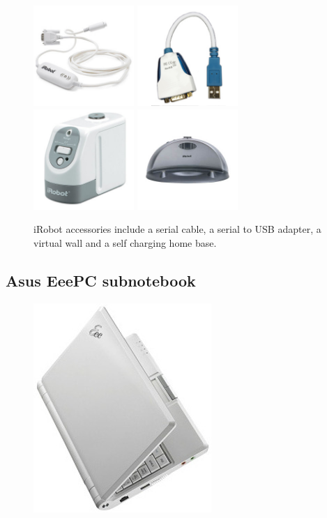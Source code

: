 \begin{figure}
\centerline{
\mbox{\includegraphics[width=1.50in]{figures/2_serial_cable.jpg}}
\mbox{\includegraphics[width=1.50in]{figures/2_serialusb_cord.jpg}}
\mbox{\includegraphics[width=1.50in]{figures/2_irwall.jpg}}
\mbox{\includegraphics[width=1.50in]{figures/2_homebase.jpg}}
}
\caption{iRobot accessories include a serial cable, a serial to USB adapter, a virtual wall and a self charging home base.}
\end{figure}

\subsection{Asus EeePC subnotebook}

\begin{figure}
\includegraphics[width=0.2\columnwidth]{figures/2_eeepc.jpg}
\end{figure}

